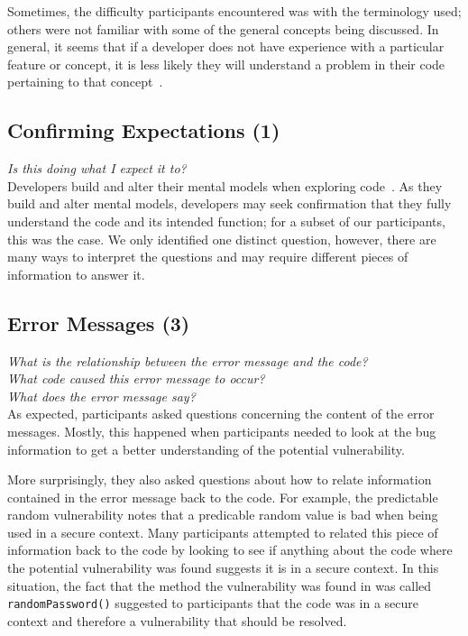 \documentclass[conference]{IEEEtran}
\begin{document}
Sometimes, the difficulty participants encountered was with the terminology used; others were not familiar with some of the general concepts being discussed. 
In general, it seems that if a developer does not have experience with a particular feature or concept, it is less likely they will understand a problem in their code pertaining to that concept~\cite{}.%

\noindent\subsection{\textbf{Confirming Expectations (1)}}

\noindent\emph{Is this doing what I expect it to?} \\
Developers build and alter their mental models when exploring code~\cite{canas1994mental, burkhardt1997mental}. 
As they build and alter mental models, developers may seek confirmation that they fully understand the code and its intended function; for a subset of our participants, this was the case. 
We only identified one distinct question, however, there are many ways to interpret the questions and may require different pieces of information to answer it.


\noindent\subsection{\textbf{Error Messages (3)}}

\noindent\emph{What is the relationship between the error message and the code?} \\
\emph{What code caused this error message to occur?} \\
\emph{What does the error message say?} \\

As expected, participants asked questions concerning the content of the error messages. 
Mostly, this happened when participants needed to look at the bug information to get a better understanding of the potential vulnerability. 

More surprisingly, they also asked questions about how to relate information contained in the error message back to the code. 
For example, the predictable random vulnerability notes that a predicable random value is bad when being used in a secure context. 
Many participants attempted to related this piece of information back to the code by looking to see if anything about the code where the potential vulnerability was found suggests it is in a secure context. 
In this situation, the fact that the method the vulnerability was found in was called \texttt{randomPassword()} suggested to participants that the code was in a secure context and therefore a vulnerability that should be resolved.
\end{document}
